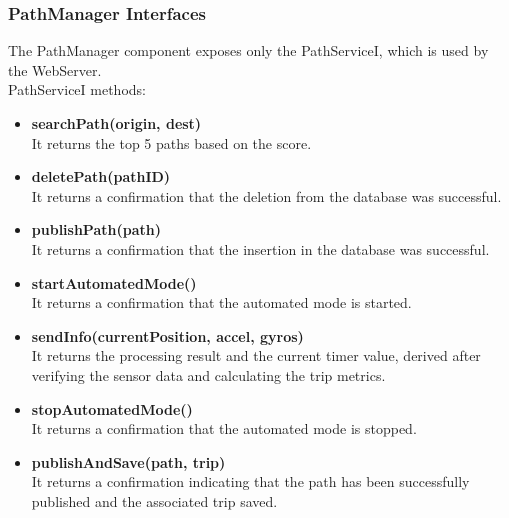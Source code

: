 \subsubsection{PathManager Interfaces}
The PathManager component exposes only the PathServiceI, which is used by the WebServer.\\
PathServiceI methods:
\begin{itemize}
    \item \textbf{searchPath(origin, dest)}\\
    It returns the top 5 paths based on the score.
    \item \textbf{deletePath(pathID)}\\
    It returns a confirmation that the deletion from the database was successful.
    \item \textbf{publishPath(path)}\\
    It returns a confirmation that the insertion in the database was successful.
    \item \textbf{startAutomatedMode()}\\
    It returns a confirmation that the automated mode is started.
    \item \textbf{sendInfo(currentPosition, accel, gyros)}\\
    It returns the processing result and the current timer value, derived after verifying the sensor data and calculating the trip metrics.
    \item \textbf{stopAutomatedMode()}\\
    It returns a confirmation that the automated mode is stopped.
    \item \textbf{publishAndSave(path, trip)}\\
    It returns a confirmation indicating that the path has been successfully published and the associated trip saved.
\end{itemize}

